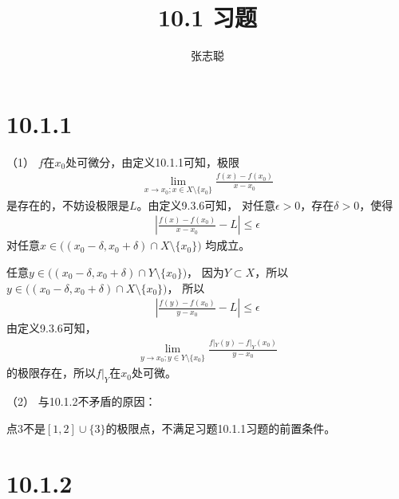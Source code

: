 \documentclass{article}
\begin{document}
\title{10.1 习题}
\author{张志聪}
\maketitle

\section*{10.1.1}

（1）
$f$在$x_0$处可微分，由定义10.1.1可知，极限
\begin{align*}
  \lim\limits_{x \to x_0; x \in X \setminus \{x_0\}} \frac{f(x) - f(x_0)}{x - x_0}
\end{align*}
是存在的，不妨设极限是$L$。由定义9.3.6可知，
对任意$\epsilon > 0$，存在$\delta > 0$，使得
\begin{align*}
  |\frac{f(x) - f(x_0)}{x - x_0} - L | \leq \epsilon
\end{align*}
对任意$x \in \big((x_0 - \delta, x_0 + \delta) \cap X \setminus \{x_0\}\big)$
均成立。

任意$y \in \big((x_0 - \delta, x_0 + \delta) \cap Y \setminus \{x_0\}\big)$，
因为$Y \subset X$，所以$y \in \big((x_0 - \delta, x_0 + \delta) \cap X \setminus \{x_0\}\big)$，
所以
\begin{align*}
  |\frac{f(y) - f(x_0)}{y - x_0} - L | \leq \epsilon
\end{align*}
由定义9.3.6可知，
\begin{align*}
  \lim\limits_{y \to x_0; y \in Y \setminus \{x_0\}} \frac{f|_Y(y) - f|_Y(x_0)}{y - x_0}
\end{align*}
的极限存在，所以$f|_Y$在$x_0$处可微。

（2）
与10.1.2不矛盾的原因：

点$3$不是$[1,2] \cup \{3\}$的极限点，不满足习题10.1.1习题的前置条件。

\section*{10.1.2}
\end{document}
